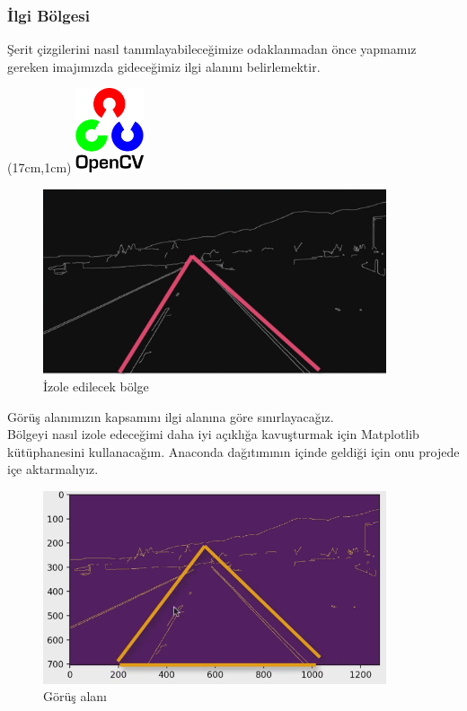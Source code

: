 \documentclass{article}
\begin{document}
\subsubsection{İlgi Bölgesi}
Şerit çizgilerini nasıl tanımlayabileceğimize odaklanmadan önce yapmamız gereken imajımızda gideceğimiz ilgi alanını belirlemektir. 
\newpage
\begin{textblock*}{5cm}(17cm,1cm) %
    \includegraphics[width=2cm]{image/Resim17.png} %
\end{textblock*}
\begin{figure}[h]
  \centering
  \includegraphics[width=0.9\textwidth]{image/Resim24.png} %
  \caption{İzole edilecek bölge}
  \label{fig:python22}  
\end{figure}
\noindent Görüş alanımızın kapsamını ilgi alanına göre sınırlayacağız.\\[5pt]
Bölgeyi nasıl izole edeceğimi daha iyi açıklığa kavuşturmak için Matplotlib kütüphanesini kullanacağım. Anaconda dağıtımının içinde geldiği için onu projede içe aktarmalıyız.\\[5pt]

\begin{figure}[h]
  \centering
  \includegraphics[width=0.9\textwidth]{image/Resim25.png} %
  \caption{Görüş alanı}
  \label{fig:python23}  
\end{figure}
\end{document}
